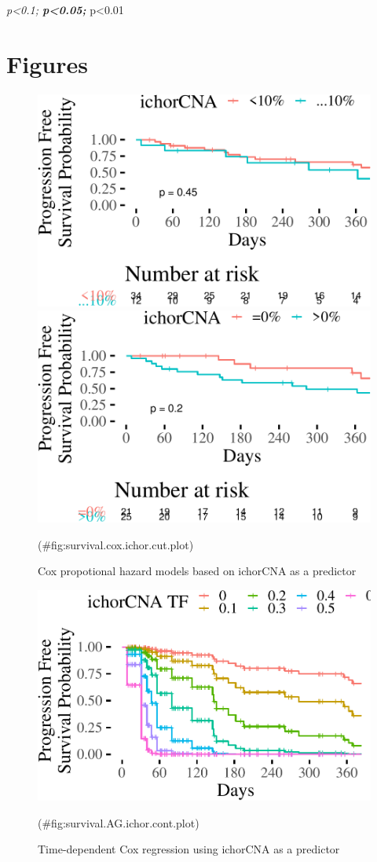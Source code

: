 \documentclass[]{article}
\begin{document}
\emph{p\textless0.1; \textbf{p\textless0.05; }}p\textless0.01

\clearpage

\hypertarget{figures}{%
\section{Figures}\label{figures}}

\begin{figure}

{\centering \includegraphics[width=0.5\linewidth]{detect.her2.manuscript_files/figure-latex/survival.cox.ichor.cut.plot-1} \includegraphics[width=0.5\linewidth]{detect.her2.manuscript_files/figure-latex/survival.cox.ichor.cut.plot-2} 

}

\caption{Cox propotional hazard models based on ichorCNA as a predictor}(\#fig:survival.cox.ichor.cut.plot)
\end{figure}

\begin{figure}

{\centering \includegraphics{detect.her2.manuscript_files/figure-latex/survival.AG.ichor.cont.plot-1} 

}

\caption{Time-dependent Cox regression using ichorCNA as a predictor}(\#fig:survival.AG.ichor.cont.plot)
\end{figure}
\end{document}
